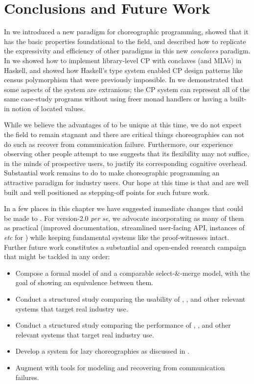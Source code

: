 \chapter{Conclusions and Future Work}
\label{sec:conclusion}

In  we introduced a new paradigm for choreographic programming,
showed that it has the basic properties foundational to the field,
and described how to replicate the expressivity and efficiency of other paradigms in this new \emph{conclaves} paradigm.
In  we showed how to implement library-level CP with conclaves (and MLVs) in Haskell,
and showed how Haskell's type system enabled CP design patterns like census polymorphism that were previously impossible.
In  we demonstrated that some aspects of the \MultiChor system are extranious;
the CP system \minichor can represent all of the same case-study programs
without using freer monad handlers or having a built-in notion of located values.

While we believe the advantages of \MultiChor to be unique at this time,
we do not expect the field to remain stagnant
and there are critical things \MultiChor choreographies can not do such as recover from communication failure.
Furthermore, our experience observing other people attempt to use \MultiChor suggests
that its flexibility may not suffice, in the minds of prospective users, to justify its corresponding cognitive overhead.
Substantial work remains to do to make choreographic programming an attractive paradigm for industry users.
Our hope at this time is that \MultiChor and \minichor are well built and well positioned as stepping-off points for such future work.

In a few places in this chapter we have suggested immediate changes that could be made to \MultiChor.
For version-2.0 \textit{per se}, we advocate incorporating as many of them as practical
(improved documentation, streamlined user-facing API, instances of  \textit{etc} for )
while keeping fundamental systems like the proof-witnesses intact.
Further future work constitutes a substantial and open-ended research campaign that might be tackled in any order:
\begin{itemize}
	\item Compose a formal model of \minichor and a comparable select-\&-merge model,
		with the goal of showing an equivalence between them.
	\item Conduct a structured study comparing the usability of \MultiChor, \minichor,
		and other relevant systems that target real industry use.
	\item Conduct a structured study comparing the performance of \MultiChor, \minichor,
		and other relevant systems that target real industry use.
	\item Develop a system for lazy choreographies as discussed in .
	\item Augment \MultiChor with tools for modeling and recovering from communication failures.
\end{itemize}

